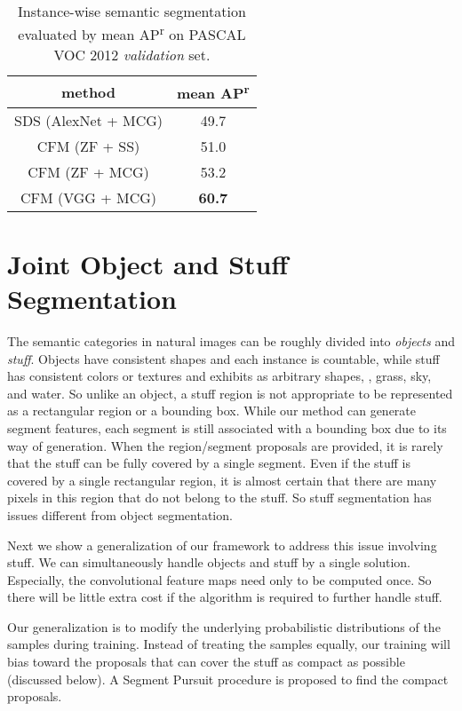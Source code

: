 \documentclass[10pt,twocolumn,letterpaper]{article}
\begin{document}
\begin{table}[t]
\begin{center}
\renewcommand{\arraystretch}{1.2}
\small
\begin{tabular}{c|c}
\hline
method & mean AP\textsuperscript{r}\\
\hline
SDS (AlexNet + MCG) \cite{hariharan2014simultaneous} & 49.7\\
\hline
CFM (ZF + SS) & 51.0\\
CFM (ZF + MCG) & 53.2\\
CFM (VGG + MCG) & \textbf{60.7}\\
\hline
\end{tabular}
\end{center}
\caption{Instance-wise semantic segmentation evaluated by mean AP\textsuperscript{r} \cite{hariharan2014simultaneous} on PASCAL VOC 2012 {\em validation} set.}
\label{tab:voc2012_approaches_sds}
\end{table}

\section{Joint Object and Stuff Segmentation}

The semantic categories in natural images can be roughly divided into \emph{objects} and \emph{stuff}. Objects have consistent shapes and each instance is countable, while stuff has consistent colors or textures and exhibits as arbitrary shapes, \eg, grass, sky, and water. So unlike an object, a stuff region is not appropriate to be represented as a rectangular region or a bounding box.
While our method can generate segment features, each segment is still associated with a bounding box due to its way of generation. When the region/segment proposals are provided, it is rarely that the stuff can be fully covered by a single segment. Even if the stuff is covered by a single rectangular region, it is almost certain that there are many pixels in this region that do not belong to the stuff. So stuff segmentation has issues different from object segmentation.

Next we show a generalization of our framework to address this issue involving stuff. We can simultaneously handle objects and stuff by a single solution. Especially, the convolutional feature maps need only to be computed once. So there will be little extra cost if the algorithm is required to further handle stuff.

Our generalization is to modify the underlying probabilistic distributions of the samples during training. Instead of treating the samples equally, our training will bias toward the proposals that can cover the stuff as compact as possible (discussed below). A Segment Pursuit procedure is proposed to find the compact proposals.
\end{document}
